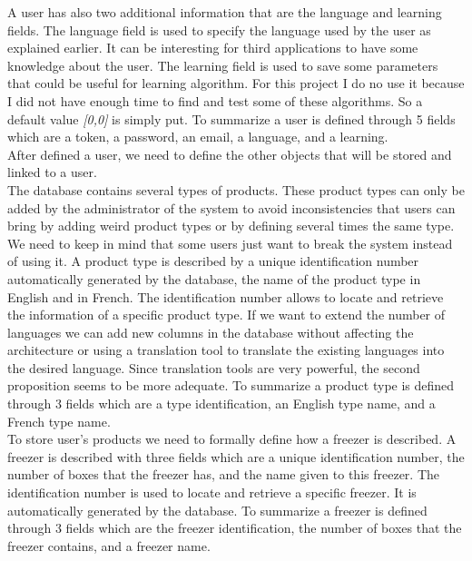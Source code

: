 A user has also two additional information that are the language and learning fields. The language field is used to specify the language used by the user as explained earlier. It can be interesting for third applications to have some knowledge about the user. The learning field is used to save some parameters that could be useful for learning algorithm. For this project I do no use it because I did not have enough time to find and test some of these algorithms. So a default value \textit{[0,0]} is simply put. To summarize a user is defined through 5 fields which are a token, a password, an email, a language, and a learning.\\

After defined a user, we need to define the other objects that will be stored and linked to a user.\\

The database contains several types of products. These product types can only be added by the administrator of the system to avoid inconsistencies that users can bring by adding weird product types or by defining several times the same type. We need to keep in mind that some users just want to break the system instead of using it. A product type is described by a unique identification number automatically generated by the database, the name of the product type in English and in French. The identification number allows to locate and retrieve the information of a specific product type. If we want to extend the number of languages we can add new columns in the database without affecting the architecture or using a translation tool to translate the existing languages into the desired language. Since translation tools are very powerful, the second proposition seems to be more adequate. To summarize a product type is defined through 3 fields which are a type identification, an English type name, and a French type name.\\

To store user's products we need to formally define how a freezer is described. A freezer is described with three fields which are a unique identification number, the number of boxes that the freezer has, and the name given to this freezer. The identification number is used to locate and retrieve a specific freezer. It is automatically generated by the database. To summarize a freezer is defined through 3 fields which are the freezer identification, the number of boxes that the freezer contains, and a freezer name.\\


